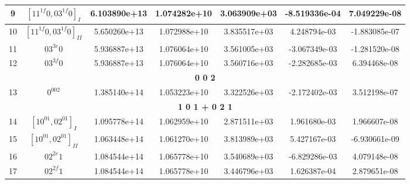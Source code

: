 \begin{table}[h!]
\begin{tabular}{|c|c|c|c|c|c|c|}
9 & $[11^{1f}0, 03^{1f}0]_{I}$ & 6.103890e+13 & 1.074282e+10 & 3.063909e+03 & -8.519336e-04 & 7.049229e-08 \\ \hline
10 & $[11^{1f}0, 03^{1f}0]_{II}$ & 5.650260e+13 & 1.072988e+10 & 3.835517e+03 & 4.248794e-03 & -1.883085e-07 \\ \hline
11 & $03^{3e}0$ & 5.936887e+13 & 1.076064e+10 & 3.561005e+03 & -3.067349e-03 & -1.281520e-08 \\ \hline
12 & $03^{3f}0$ & 5.936887e+13 & 1.076064e+10 & 3.560716e+03 & -2.282685e-03 & 6.394468e-08 \\ \hline
\multicolumn{7}{|c|}{\textbf{0 0 2}} \\ \hline
13 & $0^002$ & 1.385140e+14 & 1.053223e+10 & 3.322526e+03 & -2.172402e-03 & 3.512198e-07 \\ \hline
\multicolumn{7}{|c|}{\textbf{1 0 1 + 0 2 1}} \\ \hline
14 & $[10^01, 02^01]_{I}$ & 1.095778e+14 & 1.062959e+10 & 2.871511e+03 & 1.961680e-03 & 1.966607e-08 \\ \hline
15 & $[10^01, 02^01]_{II}$ & 1.063448e+14 & 1.061270e+10 & 3.813989e+03 & 5.427167e-03 & -6.930661e-09 \\ \hline
16 & $02^{2e}1$ & 1.084544e+14 & 1.065778e+10 & 3.540689e+03 & -6.829286e-03 & 4.079148e-08 \\ \hline
17 & $02^{2f}1$ & 1.084544e+14 & 1.065778e+10 & 3.446796e+03 & 1.626387e-04 & 2.879651e-08 \\ \hline
\end{tabular}
\end{table}


